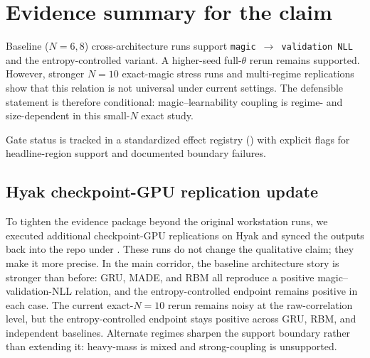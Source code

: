 \documentclass[11pt]{article}
\begin{document}
\section{Evidence summary for the claim}
Baseline ($N=6,8$) cross-architecture runs support \texttt{magic $\rightarrow$ validation NLL} and the entropy-controlled variant. A higher-seed full-$\theta$ rerun remains supported. However, stronger $N=10$ exact-magic stress runs and multi-regime replications show that this relation is not universal under current settings. The defensible statement is therefore conditional: magic--learnability coupling is regime- and size-dependent in this small-$N$ exact study.

Gate status is tracked in a standardized effect registry () with explicit flags for headline-region support and documented boundary failures.

\subsection{Hyak checkpoint-GPU replication update}
To tighten the evidence package beyond the original workstation runs, we executed additional checkpoint-GPU replications on Hyak and synced the outputs back into the repo under . These runs do not change the qualitative claim; they make it more precise. In the main corridor, the baseline architecture story is stronger than before: GRU, MADE, and RBM all reproduce a positive magic--validation-NLL relation, and the entropy-controlled endpoint remains positive in each case. The current exact-$N=10$ rerun remains noisy at the raw-correlation level, but the entropy-controlled endpoint stays positive across GRU, RBM, and independent baselines. Alternate regimes sharpen the support boundary rather than extending it: heavy-mass is mixed and strong-coupling is unsupported.
\end{document}
